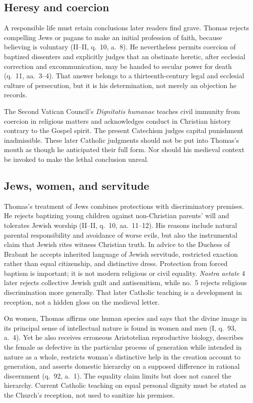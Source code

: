 \subsection{Heresy and coercion}

A responsible life must retain conclusions later readers find grave.  Thomas
rejects compelling Jews or pagans to make an initial profession of faith,
because believing is voluntary (II--II, q.~10, a.~8).  He nevertheless permits
coercion of baptized dissenters and explicitly judges that an obstinate heretic,
after ecclesial correction and excommunication, may be handed to secular power
for death (q.~11, aa.~3--4).  That answer belongs to a thirteenth-century legal
and ecclesial culture of persecution, but it is his determination, not merely
an objection he records.

The Second Vatican Council's \emph{Dignitatis humanae} teaches civil immunity
from coercion in religious matters and acknowledges conduct in Christian
history contrary to the Gospel spirit.  The present Catechism judges capital
punishment inadmissible.  These later Catholic judgments should not be put into
Thomas's mouth as though he anticipated their full form.  Nor should his
medieval context be invoked to make the lethal conclusion unreal.

\subsection{Jews, women, and servitude}

Thomas's treatment of Jews combines protections with discriminatory premises.
He rejects baptizing young children against non-Christian parents' will and
tolerates Jewish worship (II--II, q.~10, aa.~11--12).  His reasons include
natural parental responsibility and avoidance of worse evils, but also the
instrumental claim that Jewish rites witness Christian truth.  In advice to the
Duchess of Brabant he accepts inherited language of Jewish servitude,
restricted exaction rather than equal citizenship, and distinctive dress.
Protection from forced baptism is important; it is not modern religious or
civil equality.  \emph{Nostra aetate} 4 later rejects collective Jewish guilt
and antisemitism, while no.~5 rejects religious discrimination more generally.
That later Catholic teaching is a development in reception, not a hidden gloss
on the medieval letter.

On women, Thomas affirms one human species and says that the divine image in
its principal sense of intellectual nature is found in women and men (I,
q.~93, a.~4).  Yet he also receives erroneous Aristotelian reproductive
biology, describes the female as defective in the particular process of
generation while intended in nature as a whole, restricts woman's distinctive
help in the creation account to generation, and asserts domestic hierarchy on
a supposed difference in rational discernment (q.~92, a.~1).  The equality
claim limits but does not cancel the hierarchy.  Current Catholic teaching on
equal personal dignity must be stated as the Church's reception, not used to
sanitize his premises.

